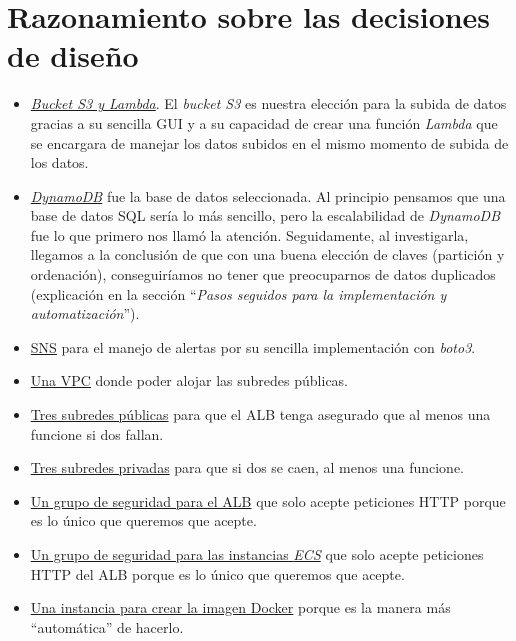 \section{Razonamiento sobre las decisiones de diseño}

\begin{itemize}
    \item \underline{\textit{Bucket S3 y Lambda}}. El \textit{bucket S3} es nuestra elección para la subida de datos gracias a su sencilla GUI y a su capacidad de crear una función \textit{Lambda} que se encargara de manejar los datos subidos en el mismo momento de subida de los datos.

    \item \underline{\textit{DynamoDB}} fue la base de datos seleccionada. Al principio pensamos que una base de datos SQL sería lo más sencillo, pero la escalabilidad de \textit{DynamoDB} fue lo que primero nos llamó la atención. Seguidamente, al investigarla, llegamos a la conclusión de que con una buena elección de claves (partición y ordenación), conseguiríamos no tener que preocuparnos de datos duplicados (explicación en la sección ``\textit{Pasos seguidos para la implementación y automatización}'').

    \item \underline{SNS} para el manejo de alertas por su sencilla implementación con \textit{boto3}.

    \item \underline{Una VPC} donde poder alojar las subredes públicas.

    \item \underline{Tres subredes públicas} para que el ALB tenga asegurado que al menos una funcione si dos fallan.

    \item \underline{Tres subredes privadas} para que si dos se caen, al menos una funcione.

    \item \underline{Un grupo de seguridad para el ALB} que solo acepte peticiones HTTP porque es lo único que queremos que acepte.

    \item \underline{Un grupo de seguridad para las instancias \textit{ECS}} que solo acepte peticiones HTTP del ALB porque es lo único que queremos que acepte.

    \item \underline{Una instancia para crear la imagen Docker} porque es la manera más ``automática'' de hacerlo.


\end{itemize}
